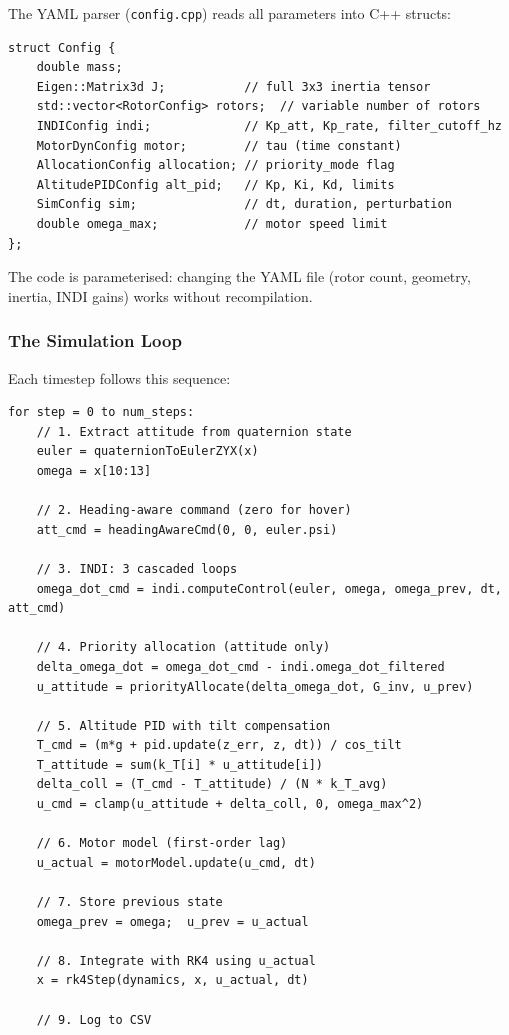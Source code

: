 \documentclass[12pt, a4paper]{article}
\begin{document}
The YAML parser (\texttt{config.cpp}) reads all parameters into C++ structs:
\begin{lstlisting}[caption={Config struct hierarchy}]
struct Config {
    double mass;
    Eigen::Matrix3d J;           // full 3x3 inertia tensor
    std::vector<RotorConfig> rotors;  // variable number of rotors
    INDIConfig indi;             // Kp_att, Kp_rate, filter_cutoff_hz
    MotorDynConfig motor;        // tau (time constant)
    AllocationConfig allocation; // priority_mode flag
    AltitudePIDConfig alt_pid;   // Kp, Ki, Kd, limits
    SimConfig sim;               // dt, duration, perturbation
    double omega_max;            // motor speed limit
};
\end{lstlisting}
The code is parameterised: changing the YAML file (rotor count, geometry, inertia, INDI gains) works without recompilation.

\subsubsection{The Simulation Loop}

Each timestep follows this sequence:
\begin{lstlisting}[caption={INDI simulation loop pseudocode}]
for step = 0 to num_steps:
    // 1. Extract attitude from quaternion state
    euler = quaternionToEulerZYX(x)
    omega = x[10:13]

    // 2. Heading-aware command (zero for hover)
    att_cmd = headingAwareCmd(0, 0, euler.psi)

    // 3. INDI: 3 cascaded loops
    omega_dot_cmd = indi.computeControl(euler, omega, omega_prev, dt, att_cmd)

    // 4. Priority allocation (attitude only)
    delta_omega_dot = omega_dot_cmd - indi.omega_dot_filtered
    u_attitude = priorityAllocate(delta_omega_dot, G_inv, u_prev)

    // 5. Altitude PID with tilt compensation
    T_cmd = (m*g + pid.update(z_err, z, dt)) / cos_tilt
    T_attitude = sum(k_T[i] * u_attitude[i])
    delta_coll = (T_cmd - T_attitude) / (N * k_T_avg)
    u_cmd = clamp(u_attitude + delta_coll, 0, omega_max^2)

    // 6. Motor model (first-order lag)
    u_actual = motorModel.update(u_cmd, dt)

    // 7. Store previous state
    omega_prev = omega;  u_prev = u_actual

    // 8. Integrate with RK4 using u_actual
    x = rk4Step(dynamics, x, u_actual, dt)

    // 9. Log to CSV
\end{lstlisting}
\end{document}
